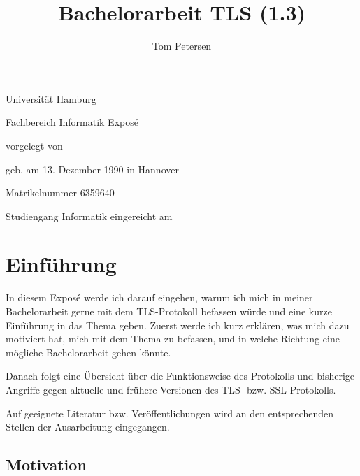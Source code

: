 \documentclass[
    12pt,
    headings=small,
    parskip=half,           %
    bibliography=totoc,
    numbers=noenddot,       %
    open=any,               %
   final                   %
    ]{scrreprt}
\title{Bachelorarbeit TLS (1.3)}
\author{Tom Petersen}
\begin{document}
\begin{titlepage}
\begin{center}\Large
	Universität Hamburg \par
	Fachbereich Informatik
	\vfill
	Exposé %
	\vfill
	\makeatletter
	{\Large\textsf{\textbf{\@title}}\par}
	\makeatother
	\vfill
	vorgelegt von
	\par\bigskip
	\makeatletter
	{\@author} \par
	\makeatother
	geb. am 13. Dezember 1990 in Hannover \par
	Matrikelnummer 6359640 \par
	Studiengang Informatik
	\vfill
	\makeatletter
	eingereicht am {\@date}
	\makeatother
	\vfill
\end{center}
\end{titlepage}

\chapter{Einführung}

In diesem Exposé werde ich darauf eingehen, warum ich mich in meiner Bachelorarbeit gerne mit dem TLS-Protokoll befassen würde und eine kurze Einführung in das Thema geben. Zuerst werde ich kurz erklären, was mich dazu motiviert hat, mich mit dem Thema zu befassen, und in welche Richtung eine mögliche Bachelorarbeit gehen könnte.

Danach folgt eine Übersicht über die Funktionsweise des Protokolls und bisherige Angriffe gegen aktuelle und frühere Versionen des TLS- bzw. SSL-Protokolls.

Auf geeignete Literatur bzw. Veröffentlichungen wird an den entsprechenden Stellen der Ausarbeitung eingegangen.

\section{Motivation}
\end{document}
